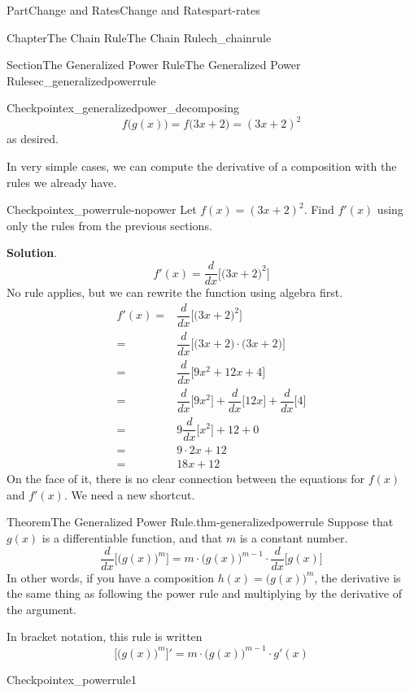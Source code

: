 \documentclass{tufte-book}
\newcommand{\blocktitlefont}{\relax}
\numberwithin{equation}{chapter}
\newcommand{\ddx}[1]{ \dfrac{d}{dx} \Big[ #1 \Big]  }
\newcommand{\D}[1]{ \Big[ #1 \Big]'  }
\newcommand{\amp}{&}
\begin{document}
\begin{partptx}{Part}{Change and Rates}{}{Change and Rates}{}{}{part-rates}
\begin{chapterptx}{Chapter}{The Chain Rule}{}{The Chain Rule}{}{}{ch_chainrule}
\begin{sectionptx}{Section}{The Generalized Power Rule}{}{The Generalized Power Rule}{}{}{sec_generalizedpowerrule}
\begin{inlineexercise}{Checkpoint}{}{ex_generalizedpower_decomposing}
\begin{equation*}
f\Big(g(x)\Big) = f\Big(3x+2\Big) = (3x+2)^2
\end{equation*}
as desired.%
\end{inlineexercise}%
In very simple cases, we can compute the derivative of a composition with the rules we already have.%
\begin{inlineexercise}{Checkpoint}{}{ex_powerrule-nopower}%
Let \(f(x) = (3x+2)^2\).  Find \(f'(x)\) using only the rules from the previous sections.%
\par\smallskip%
\noindent\textbf{\blocktitlefont Solution}.\hypertarget{ex_powerrule-nopower-2}{}\quad{}%
\begin{equation*}
f'(x) = \ddx{ \Big(3x+2\Big)^2 } 
\end{equation*}
No rule applies, but we can rewrite the function using algebra first.%
\begin{align*}
f'(x) = \amp  \ddx{ \Big(3x+2\Big)^2 } \\
= \amp \ddx{  \Big(3x+2\Big)\cdot  \Big(3x+2\Big) }\\
= \amp \ddx{  9x^2 + 12x + 4 }\\
= \amp \ddx{9x^2} + \ddx{12x} + \ddx{4} \\
= \amp 9\ddx{x^2} + 12 + 0 \\
= \amp 9\cdot 2x + 12  \\
= \amp 18x + 12  
\end{align*}
On the face of it, there is no clear connection between the equations for \(f(x)\) and \(f'(x)\). We need a new shortcut.%
\end{inlineexercise}%
\begin{theorem}{Theorem}{The Generalized Power Rule.}{}{thm-generalizedpowerrule}%
Suppose that \(g(x)\) is a differentiable function, and that \(m\) is a constant number.%
\begin{equation*}
\ddx{ \Big( g(x) \Big)^m} = m\cdot \Big( g(x) \Big)^{m-1} \cdot \ddx{g(x)} 
\end{equation*}
In other words, if you have a composition \(h(x) = \Big(g(x)\Big)^m\), the derivative is the same thing as following the power rule and multiplying by the derivative of the argument.%
\par
In bracket notation, this rule is written%
\begin{equation*}
\D{ \Big(g(x)\Big)^m } = m\cdot \Big(g(x)\Big)^{m-1}\cdot g'(x)
\end{equation*}
%
\end{theorem}
\begin{inlineexercise}{Checkpoint}{}{ex_powerrule1}%

\end{inlineexercise}
\end{sectionptx}
\end{chapterptx}
\end{partptx}
\end{document}
